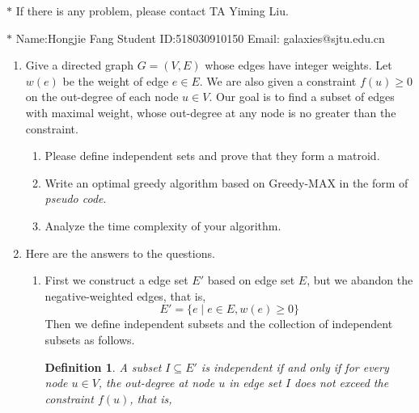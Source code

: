 \documentclass[12pt,a4paper]{article}
\makeatletter
\newtheorem*{solution}{Solution}
\newtheorem{definition}{Definition}
\theoremstyle{definition}
\renewenvironment{solution}[1][Solution] {\par\pushQED{\qed}\normalfont\topsep6\p@\@plus6\p@\relax\trivlist\item[\hskip\labelsep\bfseries#1\@addpunct{.}]\ignorespaces}{\popQED\endtrivlist\@endpefalse} \makeatother
\makeatother
\begin{document}
\noindent

\noindent{}
\begin{center}
\footnotesize{\color{red}$*$ If there is any problem, please contact TA Yiming Liu.}

\footnotesize{\color{blue}$*$ Name:Hongjie Fang  \quad Student ID:518030910150 \quad Email: galaxies@sjtu.edu.cn}
\end{center}

\begin{enumerate}
\item Give a directed graph $G=(V,E)$ whose edges have integer weights. Let $w(e)$ be the weight of edge $e\in E$. We are also given a constraint $f(u)\geq 0$ on the out-degree of each node $u\in V$. Our goal is to find a subset of edges with maximal weight, whose out-degree at any node is no greater than the constraint.
	\begin{enumerate}
	    \item Please define independent sets and prove that they form a matroid.
	    \item Write an optimal greedy algorithm based on Greedy-MAX in the form of \emph{pseudo code}.
	    \item Analyze the time complexity of your algorithm.
	\end{enumerate}
    \begin{solution} Here are the answers to the questions.
    \begin{enumerate}
    \item First we construct a edge set $E'$ based on edge set $E$, but we abandon the negative-weighted edges, that is,
        \begin{displaymath}
        E' = \{e \mid e \in E, w(e) \geq 0\}
        \end{displaymath}
        Then we define independent subsets and the collection of independent subsets as follows.
        \begin{definition}
        A subset $I \subseteq E'$ is independent if and only if for every node $u \in V$, the out-degree at node $u$ in edge set $I$ does not exceed the constraint $f(u)$, that is,
        \begin{displaymath}

\end{displaymath}
\end{definition}
\end{enumerate}
\end{solution}
\end{enumerate}
\end{document}
